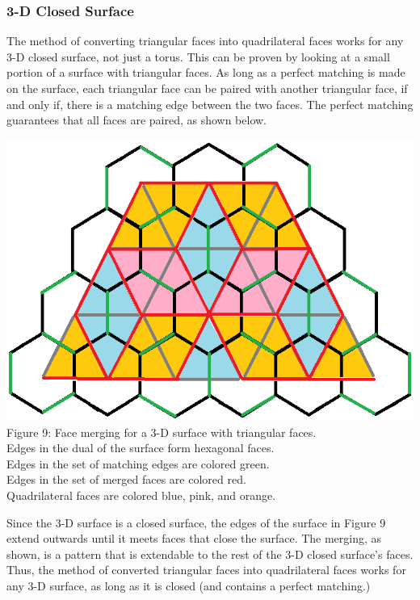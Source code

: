 \documentclass[12pt]{article}
\begin{document}
\begin{flushleft}
\newpage
\subsubsection*{3-D Closed Surface}
The method of converting triangular faces into quadrilateral faces works for any 3-D closed surface, not just a torus. This can be proven by looking at a small portion of a surface with triangular faces. As long as a perfect matching is made on the surface, each triangular face can be paired with another triangular face, if and only if, there is a matching edge between the two faces. The perfect matching guarantees that all faces are paired, as shown below.

\begin{center}
\includegraphics[scale=0.8]{images/3dmerging.png}\\
Figure 9: Face merging for a 3-D surface with triangular faces.\\
Edges in the dual of the surface form hexagonal faces.\\
Edges in the set of matching edges are colored green.\\
Edges in the set of merged faces are colored red.\\
Quadrilateral faces are colored blue, pink, and orange.
\end{center}

Since the 3-D surface is a closed surface, the edges of the surface in Figure 9 extend outwards until it meets faces that close the surface. The merging, as shown, is a pattern that is extendable to the rest of the 3-D closed surface's faces. Thus, the method of converted triangular faces into quadrilateral faces works for any 3-D surface, as long as it is closed (and contains a perfect matching.)


\end{flushleft}
\end{document}
